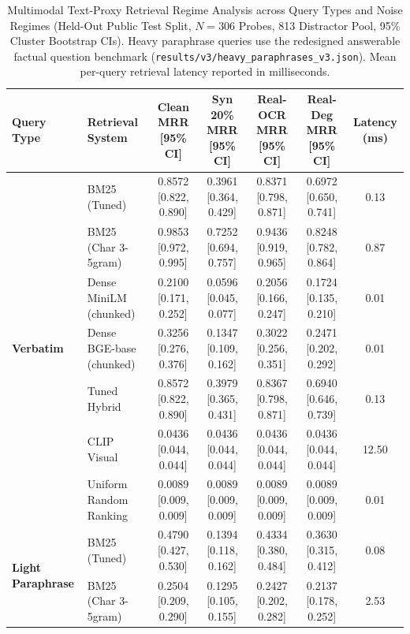 \begin{table}[t]
\centering
\small
\caption{Multimodal Text-Proxy Retrieval Regime Analysis across Query Types and Noise Regimes (Held-Out Public Test Split, $N=306$ Probes, 813 Distractor Pool, 95\% Cluster Bootstrap CIs). Heavy paraphrase queries use the redesigned answerable factual question benchmark (\texttt{results/v3/heavy\_paraphrases\_v3.json}). Mean per-query retrieval latency reported in milliseconds.}
\label{tab:regime_grid_v3}
\begin{tabular}{llccccc}
\toprule
Query Type & Retrieval System & Clean MRR [95\% CI] & Syn 20\% MRR [95\% CI] & Real-OCR MRR [95\% CI] & Real-Deg MRR [95\% CI] & Latency (ms) \\
\midrule
\multirow{7}{*}{\textbf{Verbatim}}
 & BM25 (Tuned)            & 0.8572 [0.822, 0.890] & 0.3961 [0.364, 0.429] & 0.8371 [0.798, 0.871] & 0.6972 [0.650, 0.741] & 0.13 \\
 & BM25 (Char 3-5gram)     & 0.9853 [0.972, 0.995] & 0.7252 [0.694, 0.757] & 0.9436 [0.919, 0.965] & 0.8248 [0.782, 0.864] & 0.87 \\
 & Dense MiniLM (chunked)  & 0.2100 [0.171, 0.252] & 0.0596 [0.045, 0.077] & 0.2056 [0.166, 0.247] & 0.1724 [0.135, 0.210] & 0.01 \\
 & Dense BGE-base (chunked)& 0.3256 [0.276, 0.376] & 0.1347 [0.109, 0.162] & 0.3022 [0.256, 0.351] & 0.2471 [0.202, 0.292] & 0.01 \\
 & Tuned Hybrid            & 0.8572 [0.822, 0.890] & 0.3979 [0.365, 0.431] & 0.8367 [0.798, 0.871] & 0.6940 [0.646, 0.739] & 0.13 \\
 & CLIP Visual             & 0.0436 [0.044, 0.044] & 0.0436 [0.044, 0.044] & 0.0436 [0.044, 0.044] & 0.0436 [0.044, 0.044] & 12.50 \\
 & Uniform Random Ranking  & 0.0089 [0.009, 0.009] & 0.0089 [0.009, 0.009] & 0.0089 [0.009, 0.009] & 0.0089 [0.009, 0.009] & 0.01 \\
\midrule
\multirow{7}{*}{\textbf{Light Paraphrase}}
 & BM25 (Tuned)            & 0.4790 [0.427, 0.530] & 0.1394 [0.118, 0.162] & 0.4334 [0.380, 0.484] & 0.3630 [0.315, 0.412] & 0.08 \\
 & BM25 (Char 3-5gram)     & 0.2504 [0.209, 0.290] & 0.1295 [0.105, 0.155] & 0.2427 [0.202, 0.282] & 0.2137 [0.178, 0.252] & 2.53 \\

\end{tabular}
\end{table}
